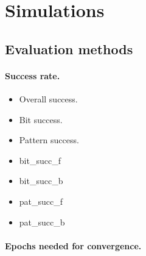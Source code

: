 
\section{Simulations}
\label{sec:simulations} 

 

\subsection{Evaluation methods} 
\label{sec:sim-evaluation-methods} 

\paragraph{Success rate.} 

\begin{itemize}
\item Overall success. 
\item Bit success. 
\item Pattern success. 

\item bit\_succ\_f
\item bit\_succ\_b
\item pat\_succ\_f 
\item pat\_succ\_b
\end{itemize} 

\paragraph{Epochs needed for convergence.} 


